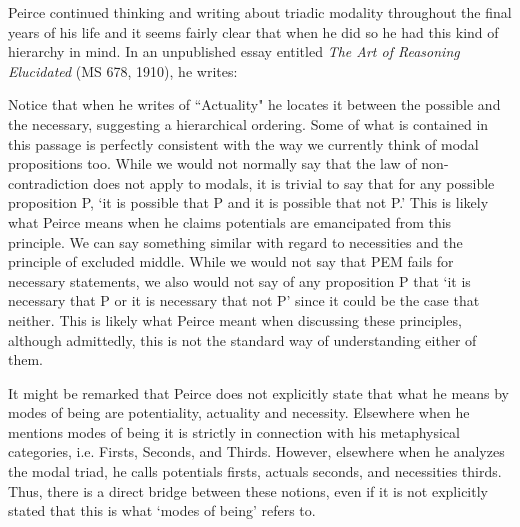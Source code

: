 \documentclass[12pt]{article}
\begin{document}
Peirce continued thinking and writing about triadic modality throughout the final years of his life and it seems fairly clear that when he did so he had this kind of hierarchy in mind. In an unpublished essay entitled \textit{The Art of Reasoning Elucidated} (MS 678, 1910), he writes:\begin{singlespace}\end{singlespace}
\noindent Notice that when he writes of ``Actuality" he locates it between the possible and the necessary, suggesting a hierarchical ordering. Some of what is contained in this passage is perfectly consistent with the way we currently think of modal propositions too. While we would not normally say that the law of non-contradiction does not apply to modals, it is trivial to say that for any possible proposition P, `it is possible that P and it is possible that not P.' This is likely what Peirce means when he claims potentials are emancipated from this principle. We can say something similar with regard to necessities and the principle of excluded middle. While we would not say that PEM fails for necessary statements, we also would not say of any proposition P that `it is necessary that P or it is necessary that not P' since it could be the case that neither. This is likely what Peirce meant when discussing these principles, although admittedly, this is not the standard way of understanding either of them.

It might be remarked that Peirce does not explicitly state that what he means by modes of being are potentiality, actuality and necessity. Elsewhere when he mentions modes of being it is strictly in connection with his metaphysical categories, i.e. Firsts, Seconds, and Thirds. However, elsewhere when he analyzes the modal triad, he calls potentials firsts, actuals seconds, and necessities thirds. Thus, there is a direct bridge between these notions, even if it is not explicitly stated that this is what `modes of being' refers to.
\end{document}

